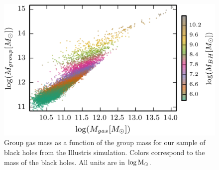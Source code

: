 \begin{figure}
\begin{centering}
\includegraphics{Figures/Mgroup_vs_Mgas}
\par\end{centering}

\protect\caption{\label{fig:mgroup_vs_mgas}Group gas mass as a function of the group
mass for our sample of black holes from the Illustris simulation.
Colors correspond to the mass of the black holes. All units are in
${\rm \log M_{\odot}}$.}


\end{figure}

